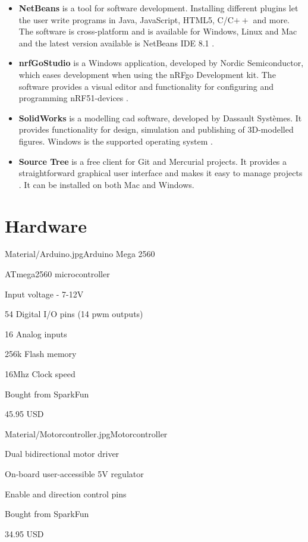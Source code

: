 \begin{itemize}
    \item \textbf{NetBeans} is a tool for software development. Installing different plugins let the user write programs in Java, JavaScript, HTML5, C/C$++$ and more. The software is cross-platform and is available for Windows, Linux and Mac and the latest version available is NetBeans IDE 8.1 \cite{netbeans}.
    \item \textbf{nrfGoStudio} is a Windows application, developed by Nordic Semiconductor, which eases development when using the nRFgo Development kit. The software provides a visual editor and functionality for configuring and programming nRF51-devices \cite{nrfgo}.
    \item \textbf{SolidWorks} is a modelling \acrshort{cad} software, developed by Dassault Systèmes. It provides functionality for design, simulation and publishing of 3D-modelled figures. Windows is the supported operating system \cite{solidworks}.
    \item \textbf{Source Tree} is a free client for Git and Mercurial projects. It provides a straightforward graphical user interface and makes it easy to manage projects \cite{sourcetree}. It can be installed on both Mac and Windows.
\end{itemize}
\newpage
\section{Hardware}
\label{sec:hardware}

\begin{material}{Material/Arduino.jpg}{Arduino Mega 2560 \cite{sparkfun} }
\item ATmega2560 microcontroller
\item Input voltage - 7-12V
\item 54 Digital I/O pins (14 \acrfull{pwm} outputs)
\item 16 Analog inputs
\item 256k Flash memory
\item 16Mhz Clock speed
\item Bought from SparkFun
\item 45.95 USD
\end{material}

\begin{material}{Material/Motorcontroller.jpg}{Motorcontroller \cite{sparkfun} }
\item Dual bidirectional motor driver
\item On-board user-accessible 5V regulator 
\item Enable and direction control pins
\item Bought from SparkFun
\item 34.95 USD
\end{material}


